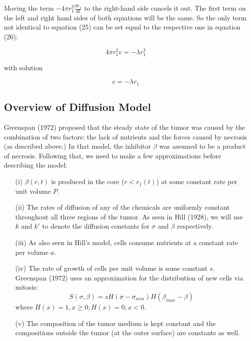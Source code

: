 \documentclass{article}
\begin{document}
\vspace*{0.25cm}

Moving the term $-4\pi r_1^2 \frac{dr_1}{dt}$ to the right-hand side cancels it out. The first term on the left and right hand sides
of both equations will be the same. So the only term not identical to equation (25) can be set equal to the respective one in equation (26):

\begin{equation}
    4\pi r_1^2v = -\lambda r_1^3
\end{equation}

with solution

\begin{equation}
    v = -\lambda r_1
\end{equation}

\subsection{Overview of Diffusion Model}

Greenspan (1972) proposed that the steady state of the tumor was caused by the combination of two factors: the lack of nutrients and the forces caused by necrosis
(as described above.) In that model, the inhibitor $\beta$ was assumed to be a product of necrosis. Following that, we need to make a few approximations
before describing the model:

\begin{enumerate}
    \item[(i)] $\beta(r, t)$ is produced in the core ($r < r_1(t)$) at some constant rate per unit volume $P$.
    \item[(ii)] The rates of diffusion of any of the chemicals are uniformly constant throughout all three regions of the tumor. As seen in Hill (1928), we will use $k$ and $k'$ to denote the diffusion constants for $\sigma$ and $\beta$ respectively.
    \item[(iii)] As also seen in Hill's model, cells consume nutrients at a constant rate per volume $a$.
    \item[(iv)] The rate of growth of cells per unit volume is some constant $s$. Greenspan (1972) uses an approximation for the distribution of new cells via mitosis: \begin{equation}
              S(\sigma, \beta) = sH(\sigma-\sigma_{min})H(\beta_{max}-\beta)
          \end{equation}
          where $H(x) = 1, x \geq 0; H(x) = 0, x < 0$.
    \item[(v)] The composition of the tumor medium is kept constant and the compositions outside the tumor (at the outer surface) are constants as well.
\end{enumerate}
\end{document}
